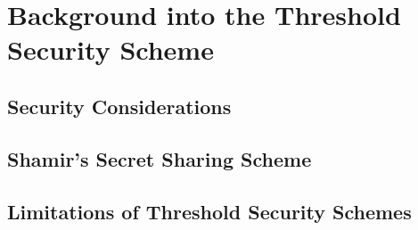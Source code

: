 \chapter{Background into the Threshold Security Scheme}

\section{Security Considerations}

\section{Shamir's Secret Sharing Scheme}

\section{Limitations of Threshold Security Schemes}